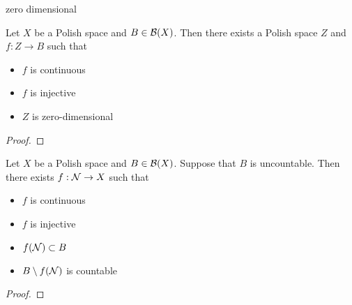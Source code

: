 \documentclass{book}
\begin{document}
	
	
	
	
	
	
	
	
	
	
	
	
	\begin{defn}
		zero dimensional
	\end{defn}

	\begin{ex} 
		Let $X$ be a Polish space and $B \in \mathcal{B}(X)$. Then there exists a Polish space $Z$ and $f:Z \rightarrow B$ such that 
		\begin{itemize}
			\item $f$ is continuous
			\item $f$ is injective
			\item $Z$ is zero-dimensional
		\end{itemize}
	\end{ex}

	\begin{proof}
	\end{proof}
	
	
	\begin{ex} 
		Let $X$ be a Polish space and $B \in \mathcal{B}(X)$. Suppose that $B$ is uncountable. Then there exists $f:\mathcal{N} \rightarrow X$ such that 
		\begin{itemize}
			\item $f$ is continuous
			\item $f$ is injective
			\item $f(\mathcal{N}) \subset B$ 
			\item $B \setminus f(\mathcal{N})$ is countable 
		\end{itemize}
	\end{ex}

	\begin{proof}
	\end{proof}
	
	
	
	
	
	
	
	
	
	
	
	
	
	
	
	
	
	
	
	
	
	
	
	
	
\end{document}
